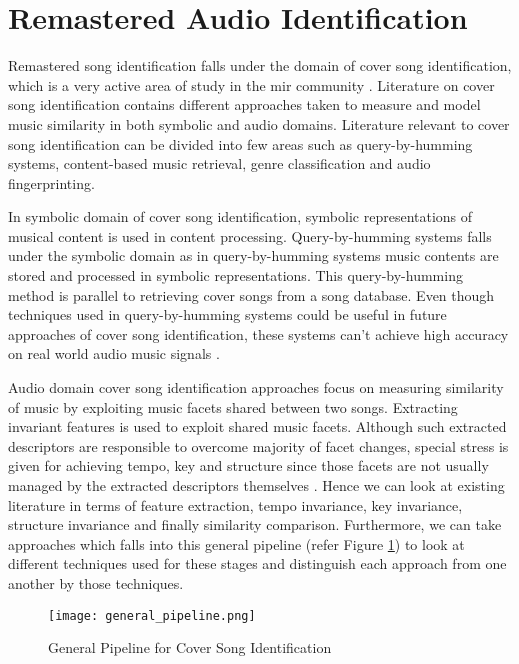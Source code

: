 \section{Remastered Audio Identification}

Remastered song identification falls under the domain of cover song identification,
which is a very active area of study in the \ac{mir} community \cite{SerraBook}.
Literature on cover song identification contains different approaches taken to
measure and model music similarity in both symbolic and audio domains. Literature
relevant to cover song identification can be divided into few areas such as
query-by-humming systems, content-based music retrieval, genre classification
and audio fingerprinting.

\vspace{12pt}

In symbolic domain of cover song identification, symbolic representations of
musical content is used in content processing. Query-by-humming systems
\cite{query_by_humming} falls under the symbolic domain as in query-by-humming
systems music contents are stored and processed in symbolic representations.
This query-by-humming method is parallel to retrieving cover songs from a song
database. Even though techniques used in query-by-humming systems could be useful
in future approaches of cover song identification, these systems can't achieve
high accuracy on real world audio music signals \cite{comparative_query_by_humming,SerraBook}.

\vspace{12pt}

Audio domain cover song identification approaches focus on measuring similarity
of music by exploiting music facets shared between two songs. Extracting invariant
features is used to exploit shared music facets. Although such extracted descriptors
are responsible to overcome majority of facet changes, special stress is given for
achieving tempo, key and structure since those facets are not usually managed by
the extracted descriptors themselves \cite{SerraBook}. Hence we can look at existing
literature in terms of feature extraction, tempo invariance, key invariance, structure
invariance and finally similarity comparison. Furthermore, we can take approaches which falls
into this general pipeline (refer Figure \ref{fig:general_pipeline}) to look at different techniques used for these stages and
distinguish each approach from one another by those techniques.

\vspace{12pt}
\begin{figure}[H]
    \centering
    \texttt{[image: general\_pipeline.png]}
    \caption{General Pipeline for Cover Song Identification}
    \label{fig:general_pipeline}
\end{figure}
\vspace{12pt}

